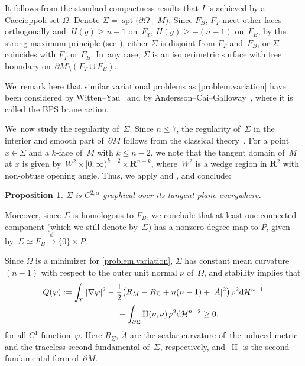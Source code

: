 \documentclass[10pt,a4paper]{amsart}
\numberwithin{equation}{section}
\newtheorem{prop}{Proposition}[section]
\theoremstyle{definition}
\newcommand{\RR}{\mathbf{R}}
\newcommand{\cH}{\mathcal H}
\DeclareMathOperator{\spt}{spt}
\DeclareMathOperator{\secondfund}{II}
\begin{document}
It follows from the standard compactness results that $I$ is achieved by a Caccioppoli set $\Omega$. Denote $\Sigma=\spt\big(\partial \Omega\llcorner \mathring{M}\big)$. Since $F_B$, $F_T$ meet other faces orthogonally and~$H(g)\ge n-1$ on~$F_T$, $H(g)\ge -(n-1)$ on~$F_B$, by the strong maximum principle (see \cite[Section~3.1]{li2019dihedral}), either $\Sigma$ is disjoint from $F_T$ and~$F_B$, or $\Sigma$ coincides with $F_T$ or $F_B$. In~any case, $\Sigma$ is an isoperimetric surface with free boundary on~$\partial M\setminus (F_T\cup F_B)$.

We~remark here that similar variational problems as \eqref{problem.variation} have been considered by Witten--Yau~\cite{WittenYau1999connectedness} and by Andersson--Cai--Galloway~\cite{AnderssonCaiGalloway2008rigidity}, where it is called the BPS brane action.

We~now study the regularity of~$\Sigma$. Since $n\le 7$, the regularity of~$\Sigma$ in the interior and smooth part of~$\partial M$ follows from the classical theory~\cite{GruterJost1986Allard, Simons1968minimal}. For a point $x\in \Sigma$ and a $k$-face of~$M$ with $k\le n-2$, we note that the tangent domain of~$M$ at $x$ is given by~$W^2\times [0,\infty)^{k-2}\times \RR^{n-k}$, where~$W^2$ is a wedge region in $\RR^2$ with non-obtuse opening angle. Thus, we apply \cite[Section~9]{EdelenLi2020regularity} and \cite[Appendix B]{li2019dihedral}, and conclude:
\begin{prop}
$\Sigma$ is $C^{2,\alpha}$ graphical over its tangent plane everywhere.
\end{prop}

Moreover, since $\Sigma$ is homologous to $F_B$, we conclude that at least one connected component (which we still denote by~$\Sigma$) has a nonzero degree map to $P$, given by~$\Sigma\simeq F_B\xrightarrow{\phi} \{0\}\times P$.

Since $\Omega$ is a minimizer for \eqref{problem.variation}, $\Sigma$ has constant mean curvature $(n-1)$ with respect to the outer unit normal $\nu$ of~$\Omega$, and stability implies that
\begin{gather}
Q(\varphi):=\int_\Sigma |\nabla \varphi|^2 -\frac{1}{2}\big(R_M-R_\Sigma + n(n-1)+|\mathring{A}|^2\big)\varphi^2 {\rm d}\cH^{n-1}\nonumber
\\ \hphantom{Q(\varphi):=}
{} -\int_{\partial \Sigma} \secondfund(\nu,\nu)\varphi^2 {\rm d}\cH^{n-2}\ge 0,
\end{gather}
for all $C^1$ function~$\varphi$. Here $R_\Sigma$, $\mathring{A}$ are the scalar curvature of~the induced metric and the traceless second fundamental of~$\Sigma$, respectively, and~$\secondfund$ is the second fundamental form of~$\partial M$.
\end{document}

